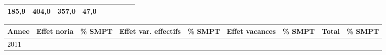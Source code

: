 \begin{longtable}[]{@{}lllllllll@{}}
\begin{minipage}[t]{0.10\columnwidth}
185,9\strut
\end{minipage} & \begin{minipage}[t]{0.07\columnwidth}\raggedright
404,0\strut
\end{minipage} & \begin{minipage}[t]{0.07\columnwidth}\raggedright
357,0\strut
\end{minipage} & \begin{minipage}[t]{0.11\columnwidth}\raggedright
47,0\strut
\end{minipage} & \begin{minipage}[t]{0.14\columnwidth}\raggedright
\strut
\end{minipage}\tabularnewline
\bottomrule
\end{longtable}

\begin{longtable}[]{@{}lllllllll@{}}
\toprule
\begin{minipage}[b]{0.05\columnwidth}\raggedright
Annee\strut
\end{minipage} & \begin{minipage}[b]{0.10\columnwidth}\raggedright
Effet noria\strut
\end{minipage} & \begin{minipage}[b]{0.06\columnwidth}\raggedright
\% SMPT\strut
\end{minipage} & \begin{minipage}[b]{0.16\columnwidth}\raggedright
Effet var. effectifs\strut
\end{minipage} & \begin{minipage}[b]{0.06\columnwidth}\raggedright
\% SMPT\strut
\end{minipage} & \begin{minipage}[b]{0.12\columnwidth}\raggedright
Effet vacances\strut
\end{minipage} & \begin{minipage}[b]{0.06\columnwidth}\raggedright
\% SMPT\strut
\end{minipage} & \begin{minipage}[b]{0.10\columnwidth}\raggedright
Total\strut
\end{minipage} & \begin{minipage}[b]{0.06\columnwidth}\raggedright
\% SMPT\strut
\end{minipage}\tabularnewline
\midrule
\endhead
\begin{minipage}[t]{0.05\columnwidth}\raggedright
2011\strut
\end{minipage} & \begin{minipage}[t]{0.10\columnwidth}\raggedright

\end{minipage}
\end{longtable}

